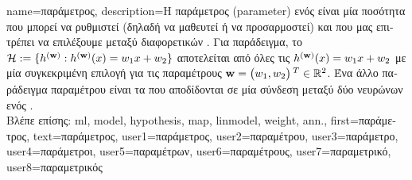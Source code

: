 {name={\foreignlanguage{greek}{παράμετρος}},
	description={\foreignlanguage{greek}{Η παράμετρος} (parameter) 
		\foreignlanguage{greek}{ενός}   \foreignlanguage{greek}{είναι μία ποσότητα που μπορεί να ρυθμιστεί 
		(δηλαδή να μαθευτεί ή να προσαρμοστεί) και που μας επιτρέπει να επιλέξουμε μεταξύ διαφορετικών}  
		. \foreignlanguage{greek}{Για παράδειγμα, το}  
		$\mathcal{H} := \{h^{({\bf w})}: h^{({\bf w})}(x)= w_{1} x + w_{2}\}$  
		\foreignlanguage{greek}{αποτελείται από όλες τις}   
		$h^{({\bf w})}(x)= w_{1} x + w_{2}$  
		\foreignlanguage{greek}{με μία συγκεκριμένη επιλογή για τις παραμέτρους 
		${\bf w} = \big(w_{1},w_{2}\big)\,^{T} \in \mathbb{R}^{2}$. 
		Ένα άλλο παράδειγμα παραμέτρου}  \foreignlanguage{greek}{είναι τα}  
		\foreignlanguage{greek}{που αποδίδονται σε μία σύνδεση μεταξύ δύο νευρώνων ενός} .
		\\
		\foreignlanguage{greek}{Βλέπε επίσης:} \gls{ml}, \gls{model}, \gls{hypothesis}, \gls{map}, \gls{linmodel}, \gls{weight}, \gls{ann}.},
	first={\foreignlanguage{greek}{παράμετρος}},
	text={\foreignlanguage{greek}{παράμετρος}},
	user1={\foreignlanguage{greek}{παράμετρος}}, %
	user2={\foreignlanguage{greek}{παραμέτρου}}, %
	user3={\foreignlanguage{greek}{παράμετρο}}, %
	user4={\foreignlanguage{greek}{παράμετροι}}, %
	user5={\foreignlanguage{greek}{παραμέτρων}}, %
	user6={\foreignlanguage{greek}{παραμέτρους}}, %
	user7={\foreignlanguage{greek}{παραμετρικό}}, %
	user8={\foreignlanguage{greek}{παραμετρικός}} %
}

